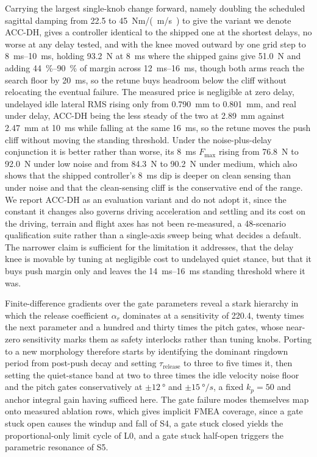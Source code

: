 \documentclass[a4paper,fleqn]{cas-dc}
\begin{document}
Carrying the largest single-knob change forward, namely doubling the scheduled
sagittal damping from \SI{22.5}{} to \SI{45}{Nm/(m/s)} to give the variant we
denote ACC-DH, gives a controller identical to the shipped one at the shortest
delays, no worse at any delay tested, and with the knee moved outward by one grid
step to \SIrange{8}{10}{ms}, holding \SI{93.2}{N} at \SI{8}{ms} where the shipped
gains give \SI{51.0}{N} and adding \SIrange{44}{90}{\percent} of margin across
\SIrange{12}{16}{ms}, though both arms reach the search floor by \SI{20}{ms}, so
the retune buys headroom below the cliff without relocating the eventual failure.
The measured price is negligible at zero delay, undelayed idle lateral RMS rising
only from \SI{0.790}{mm} to \SI{0.801}{mm}, and real under delay, ACC-DH being
the less steady of the two at \SI{2.89}{mm} against \SI{2.47}{mm} at \SI{10}{ms}
while falling at the same \SI{16}{ms}, so the retune moves the push cliff without
moving the standing threshold. Under the noise-plus-delay conjunction it is
better rather than worse, its \SI{8}{ms} $F_{\max}$ rising from \SI{76.8}{N} to
\SI{92.0}{N} under low noise and from \SI{84.3}{N} to \SI{90.2}{N} under medium,
which also shows that the shipped controller's \SI{8}{ms} dip is deeper on clean
sensing than under noise and that the clean-sensing cliff is the conservative end
of the range. We report ACC-DH as an
evaluation variant and do not adopt it, since the constant it changes also
governs driving acceleration and settling and its cost on the driving, terrain
and flight axes has not been re-measured, a \num{48}-scenario qualification suite
rather than a single-axis sweep being what decides a default. The narrower claim
is sufficient for the limitation it addresses, that the delay knee is movable by
tuning at negligible cost to undelayed quiet stance, but that it buys push margin
only and leaves the
\SIrange{14}{16}{ms} standing threshold where it was.

Finite-difference gradients over the gate parameters reveal a stark hierarchy in
which the release coefficient $\alpha_r$ dominates at a sensitivity of
\num{220.4}, twenty times the next parameter and a hundred and thirty times the
pitch gates, whose near-zero sensitivity marks them as safety interlocks rather
than tuning knobs. Porting to a new morphology therefore starts by identifying
the dominant ringdown period from post-push decay and setting
$\tau_{\text{release}}$ to three to five times it, then setting the quiet-stance
band at two to three times the idle velocity noise floor and the pitch gates
conservatively at $\pm\SI{12}{\degree}$ and $\pm\SI{15}{\degree/s}$, a fixed
$k_p{=}50$ and anchor integral gain having sufficed here. The gate failure modes
themselves map onto measured ablation rows, which gives implicit FMEA coverage,
since a gate stuck open causes the windup and fall of S4, a gate stuck closed
yields the proportional-only limit cycle of L0, and a gate stuck half-open
triggers the parametric resonance of S5.
\end{document}
